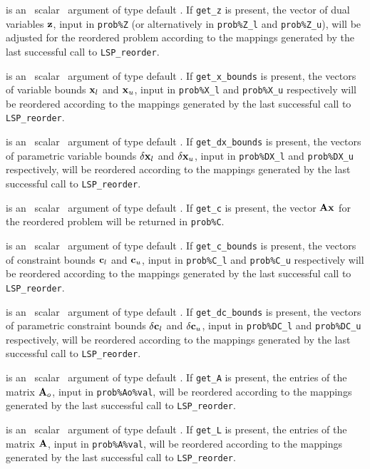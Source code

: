 \documentclass{galahad}
\newcommand{\packagename}{LSP}
\begin{document}
\begin{description}
is an \optional\ scalar \intentin\ argument of type default \logical. 
If {\tt get\_z} is present, the vector of dual variables ${\mathbf{z}}$, input in 
{\tt prob\%Z} (or alternatively in {\tt prob\%Z\_l} and {\tt prob\%Z\_u}),
will be adjusted for the reordered problem according 
to the mappings generated by the last successful 
call to {\tt \packagename\_reorder}. 
 
is an \optional\ scalar \intentin\ argument of type default \logical. 
If {\tt get\_x\_bounds} is present, 
the vectors of variable bounds ${\mathbf{x}}_l$ and 
${\mathbf{x}}_u$, input in {\tt prob\%X\_l} and {\tt prob\%X\_u} respectively
will be reordered according to the 
mappings generated by the last successful call to {\tt \packagename\_reorder}. 
 
is an \optional\ scalar \intentin\ argument of type default \logical. 
If {\tt get\_dx\_bounds} is present, 
the vectors of parametric variable bounds $\delta {\mathbf{x}}_l$ and 
$\delta {\mathbf{x}}_u$, input in {\tt prob\%DX\_l} and {\tt prob\%DX\_u} respectively,
will be reordered according to the 
mappings generated by the last successful call to {\tt \packagename\_reorder}. 
 
is an \optional\ scalar \intentin\ argument of type default \logical. 
If {\tt get\_c} is present, the vector ${\mathbf{A}} {\mathbf{x}}$ for the reordered problem 
will be returned in {\tt prob\%C}. 
 
is an \optional\ scalar \intentin\ argument of type default \logical. 
If {\tt get\_c\_bounds} is present, 
the vectors of constraint bounds ${\mathbf{c}}_l$ and 
${\mathbf{c}}_u$, input in {\tt prob\%C\_l} and {\tt prob\%C\_u} respectively
will be reordered according to the 
mappings generated by the last successful call to {\tt \packagename\_reorder}. 
 
is an \optional\ scalar \intentin\ argument of type default \logical. 
If {\tt get\_dc\_bounds} is present, 
the vectors of parametric constraint bounds $\delta {\mathbf{c}}_l$ and 
$\delta {\mathbf{c}}_u$, input in {\tt prob\%DC\_l} and {\tt prob\%DC\_u} respectively,
will be reordered according to the 
mappings generated by the last successful call to {\tt \packagename\_reorder}. 
 
is an \optional\ scalar \intentin\ argument of type default \logical. 
If {\tt get\_A} is present, the entries of the 
matrix ${\mathbf{A}}_o$, input in {\tt prob\%Ao\%val}, will be reordered according 
to the 
mappings generated by the last successful call to {\tt \packagename\_reorder}. 
 
is an \optional\ scalar \intentin\ argument of type default \logical. 
If {\tt get\_L} is present, the entries of the 
matrix ${\mathbf{A}}$, input in {\tt prob\%A\%val}, will be reordered according to the 
mappings generated by the last successful call to {\tt \packagename\_reorder}. 
 
\end{description}
\end{document}

